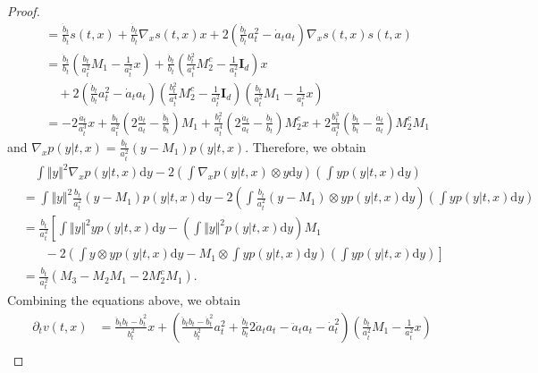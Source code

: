 \documentclass[twoside,11pt]{article}
\def\rmI{{\mathbf{I}}}
\newcommand{\diff}{\mathrm{d}}
\numberwithin{equation}{section}
\begin{document}
\begin{proof}
\begin{align*}
    &= \frac{\dot{b}_t}{b_t} s(t, x) + \frac{\dot{b}_t}{b_t} \nabla_x s(t, x) x
       + 2 \left( \frac{\dot{b}_t}{b_t} a_t^2 - \dot{a}_t a_t \right) \nabla_x s(t, x) s(t, x) \\
    &= \frac{\dot{b}_t}{b_t} \left( \frac{b_t}{a_t^2} M_1 - \frac{1}{a_t^2} x \right)
       + \frac{\dot{b}_t}{b_t} \left( \frac{b_t^2}{a_t^4} M^c_2 - \frac{1}{a_t^2} \rmI_d \right) x \\
    & \quad + 2 \left( \frac{\dot{b}_t}{b_t} a_t^2 - \dot{a}_t a_t \right) \left( \frac{b_t^2}{a_t^4} M^c_2 - \frac{1}{a_t^2} \rmI_d \right) \left( \frac{b_t}{a_t^2} M_1 - \frac{1}{a_t^2} x \right) \\
    &= -2 \frac{\dot{a}_t}{a_t^3} x + \frac{b_t}{a_t^2} \left( 2 \frac{\dot{a}_t}{a_t} - \frac{\dot{b}_t}{b_t} \right) M_1
       + \frac{b_t^2}{a_t^4} \left( 2 \frac{\dot{a}_t}{a_t} - \frac{\dot{b}_t}{b_t} \right) M^c_2 x
       + 2 \frac{b_t^3}{a_t^4} \left( \frac{\dot{b}_t}{b_t} - \frac{\dot{a}_t}{a_t} \right) M^c_2 M_1
\end{align*}
and $\nabla_x p(y | t, x) = \frac{b_t}{a_t^2} \left(y - M_1 \right) p(y | t, x)$.
Therefore, we obtain
\begin{align*}
     & \quad \int \Vert y \Vert^2 \nabla_x p(y | t, x) \diff y - 2 \left( \int \nabla_x p(y | t, x) \otimes y \diff y \right) \left( \int y p(y | t, x) \diff y \right) \\
     &= \int \Vert y \Vert^2 \frac{b_t}{a_t^2} \left(y - M_1 \right) p(y | t, x) \diff y
        - 2 \left( \int \frac{b_t}{a_t^2} \left(y - M_1 \right) \otimes y p(y | t, x) \diff y \right) \left( \int y p(y | t, x) \diff y \right) \\
     &= \frac{b_t}{a_t^2} \left[ \int \Vert y \Vert^2 y p(y | t, x) \diff y
     - \left( \int \Vert y \Vert^2 p(y | t, x) \diff y \right) M_1 \right. \\
     & \left.~~~~~~~~ -2 \left( \int y \otimes y p(y | t, x) \diff y
     - M_1 \otimes \int y p(y | t, x) \diff y \right) \left( \int y p(y | t, x) \diff y \right) \right] \\
     &= \frac{b_t}{a_t^2} \left( M_3
     - M_2 M_1
     - 2 M^c_2 M_1 \right).
\end{align*}
Combining the equations above, we obtain
\begin{align*}
    \partial_t v(t, x)
    &= \frac{\ddot{b}_tb_t - \dot{b}_t^2}{b_t^2} x
       + \left( \frac{\ddot{b}_tb_t - \dot{b}_t^2}{b_t^2} a_t^2 + \frac{\dot{b}_t}{b_t} 2 \dot{a}_t a_t - \ddot{a}_t a_t - \dot{a}^2_t \right) \left( \frac{b_t}{a_t^2} M_1 - \frac{1}{a_t^2} x \right) \\

\end{align*}
\end{proof}
\end{document}
